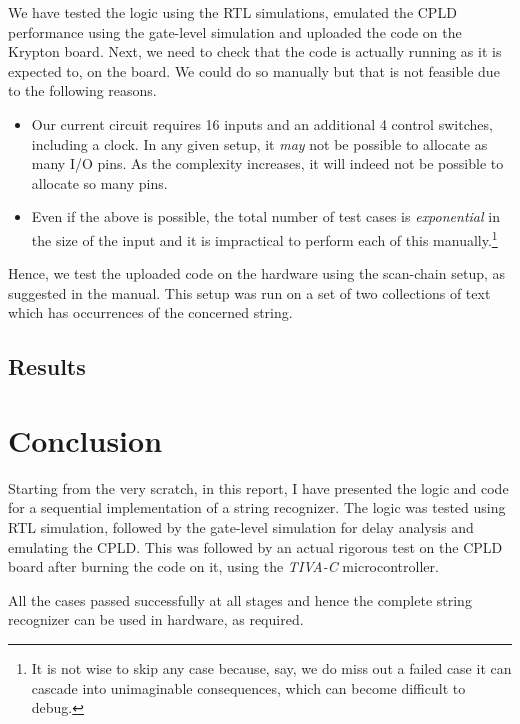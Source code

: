\documentclass[a4paper, 11pt]{article}
\begin{document}
We have tested the logic using the RTL simulations, emulated the CPLD performance using the gate-level simulation and uploaded the code on the Krypton board. Next, we need to check that the code is actually running as it is expected to, on the board. We could do so manually but that is not feasible due to the following reasons.
\begin{itemize}
	\item Our current circuit requires 16 inputs and an additional 4 control switches, including a clock. In any given setup, it \emph{may} not be possible to allocate as many I/O pins. As the complexity increases, it will indeed not be possible to allocate so many pins.
	\item Even if the above is possible, the total number of test cases is \emph{exponential} in the size of the input and it is impractical to perform each of this manually.\footnote{It is not wise to skip any case because, say, we do miss out a failed case it can cascade into unimaginable consequences, which can become difficult to debug.}
\end{itemize}

Hence, we test the uploaded code on the hardware using the scan-chain setup, as suggested in the manual. This setup was run on a set of two collections of text which has occurrences of the concerned string.

\subsection*{Results}



\section*{Conclusion}
Starting from the very scratch, in this report, I have presented the logic and code for a sequential implementation of a string recognizer. The logic was tested using RTL simulation, followed by the gate-level simulation for delay analysis and emulating the CPLD. This was followed by an actual rigorous test on the CPLD board after burning the code on it, using the \emph{TIVA-C} microcontroller.
\par
All the cases passed successfully at all stages and hence the complete string recognizer can be used in hardware, as required.
\end{document}
